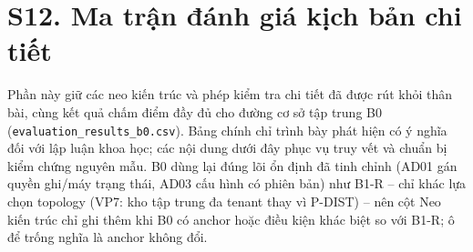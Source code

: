 \documentclass[a4paper,11pt]{article}
\begin{document}
\section*{S12. Ma trận đánh giá kịch bản chi tiết}
Phần này giữ các neo kiến trúc và phép kiểm tra chi tiết đã được rút khỏi thân bài, cùng kết quả chấm điểm đầy đủ cho đường cơ sở tập trung B0 (\texttt{evaluation\_results\_b0.csv}). Bảng chính chỉ trình bày phát hiện có ý nghĩa đối với lập luận khoa học; các nội dung dưới đây phục vụ truy vết và chuẩn bị kiểm chứng nguyên mẫu. B0 dùng lại đúng lõi ổn định đã tinh chỉnh (AD01 gán quyền ghi/máy trạng thái, AD03 cấu hình có phiên bản) như B1-R -- chỉ khác lựa chọn topology (VP7: kho tập trung đa tenant thay vì P-DIST) -- nên cột Neo kiến trúc chỉ ghi thêm khi B0 có anchor hoặc điều kiện khác biệt so với B1-R; ô để trống nghĩa là anchor không đổi.
\end{document}

